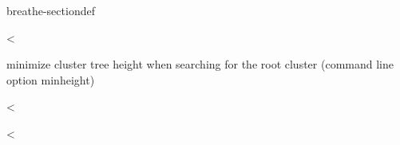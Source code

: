 \documentclass[letterpaper,10pt,openany,oneside,english]{sphinxmanual}
\begin{document}
\begin{fulllineitems}
\begin{sphinxuseclass}{breathe-sectiondef}

\begin{fulllineitems}
\label{\detokenize{ref/ref_cpp:_CPPv4N8ToulBar210maxsatevalE}}\label{\detokenize{ref/ref_cpp:_CPPv3N8ToulBar210maxsatevalE}}\label{\detokenize{ref/ref_cpp:_CPPv2N8ToulBar210maxsatevalE}}\label{\detokenize{ref/ref_cpp:ToulBar2::maxsateval__b}}
\pysigstartsignatures
\pysigstartmultiline
{}
\pysigstopmultiline
\pysigstopsignatures
\sphinxAtStartPar
\textless{} 

\sphinxAtStartPar
minimize cluster tree height when searching for the root cluster (command line option \sphinxhyphen{}minheight) 

\end{fulllineitems}


\begin{fulllineitems}
\label{\detokenize{ref/ref_cpp:_CPPv4N8ToulBar27xmlflagE}}\label{\detokenize{ref/ref_cpp:_CPPv3N8ToulBar27xmlflagE}}\label{\detokenize{ref/ref_cpp:_CPPv2N8ToulBar27xmlflagE}}\label{\detokenize{ref/ref_cpp:ToulBar2::xmlflag__b}}
\pysigstartsignatures
\pysigstartmultiline
{}
\pysigstopmultiline
\pysigstopsignatures
\sphinxAtStartPar
\textless{} 

\end{fulllineitems}


\begin{fulllineitems}
\label{\detokenize{ref/ref_cpp:_CPPv4N8ToulBar26xmlcopE}}\label{\detokenize{ref/ref_cpp:_CPPv3N8ToulBar26xmlcopE}}\label{\detokenize{ref/ref_cpp:_CPPv2N8ToulBar26xmlcopE}}\label{\detokenize{ref/ref_cpp:ToulBar2::xmlcop__b}}
\pysigstartsignatures
\pysigstartmultiline
{}
\pysigstopmultiline
\pysigstopsignatures
\sphinxAtStartPar
\textless{} 


\end{fulllineitems}
\end{sphinxuseclass}
\end{fulllineitems}
\end{document}
